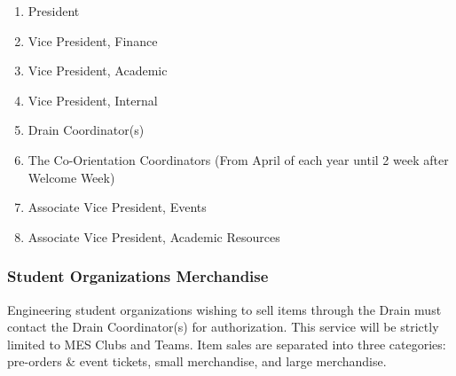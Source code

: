 \begin{enumerate}
 \item
  President
 \item
  Vice President, Finance
 \item
  Vice President, Academic
 \item
  Vice President, Internal
 \item
  Drain Coordinator(s)
 \item
  The Co-Orientation Coordinators (From April of each year until 2 week after Welcome Week) %
 \item
  Associate Vice President, Events
 \item
  Associate Vice President, Academic Resources

\end{enumerate}

\subsubsection{Student Organizations Merchandise}
\label{student-organizations-merchandise}
Engineering student organizations wishing to sell items through the
Drain must contact the Drain Coordinator(s) for authorization. This
service will be strictly limited to MES Clubs and Teams. Item sales are
separated into three categories: pre-orders \& event tickets, small
merchandise, and large merchandise.

